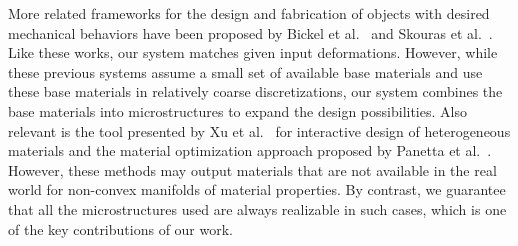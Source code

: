 More related frameworks for the design and fabrication of objects with desired mechanical behaviors have been proposed by Bickel et al.~\cite{Bickel2010} and Skouras et al.~\cite{Skouras2013}. Like these works, our system matches given input deformations. However, while these previous systems assume a small set of available base materials and use these base materials in relatively coarse discretizations, our system combines the base materials into microstructures to expand the design possibilities. Also relevant is the tool presented by Xu et al.~\cite{Xu2014} for interactive design of heterogeneous materials and the material optimization approach proposed by Panetta et al.~\cite{Panetta:2015}.
However, these methods may output materials that are not available in the real world for non-convex manifolds of material properties. By contrast, we guarantee that all the microstructures used are always realizable in such cases, which is one of the key contributions of our work.
